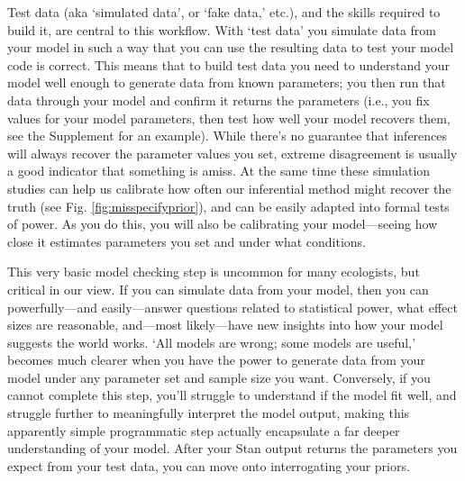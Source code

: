 \documentclass[11pt]{article}
\begin{document}
{Test data (aka `simulated data', or  `fake data,' etc.), and the skills required to build it, are central to this workflow. With `test data' you simulate data from your model in such a way that you can use the resulting data to test your model code is correct. This means that to build test data you need to understand your model well enough to generate data from known parameters; you then run that data through your model and confirm it returns the parameters (i.e., you fix values for your model parameters, then test how well your model recovers them, see the Supplement for an example). While there's no guarantee that inferences will always recover the parameter values you set, extreme disagreement is usually a good indicator that something is amiss. At the same time these simulation studies can help us calibrate how often our inferential method might recover the truth (see Fig. \ref{fig:misspecifyprior}), and can be easily adapted into formal tests of power. As you do this, you will also be calibrating your model---seeing how close it estimates parameters you set and under what conditions. %


This very basic model checking step is uncommon for many ecologists, but critical in our view. If you can simulate data from your model, then you can powerfully---and easily---answer questions related to statistical power, what effect sizes are reasonable, and---most likely---have new insights into how your model suggests the world works. `All models are wrong; some models are useful,' becomes much clearer when you have the power to generate data from your model under any parameter set and sample size you want. Conversely, if you cannot complete this step, you'll struggle to understand if the model fit well, and struggle further to meaningfully interpret the model output, making this apparently simple programmatic step actually encapsulate a far deeper understanding of your model. After your \textsf{Stan} output returns the parameters you expect from your test data, you can move onto interrogating your priors. 

}
\end{document}
